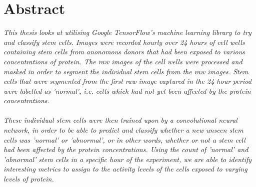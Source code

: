 
\section*{Abstract}

\emph{This thesis looks at utilising Google TensorFlow's machine learning library to try and classify stem cells. Images were recorded hourly over 24 hours of cell wells containing stem cells from anonomous donors that had been exposed to various concentrations of protein. The raw images of the cell wells were processed and masked in order to segment the individual stem cells from the raw images. Stem cells that were segmented from the first raw image captured in the 24 hour period were labelled as 'normal', i.e. cells which had not yet been affected by the protein concentrations. \\ \\  These individual stem cells were then trained upon by a convolutional neural network, in order to be able to predict and classify whether a new unseen stem cells was 'normal' or 'abnormal', or in other words, whether or not a stem cell had been affected by the protein concentrations. Using the count of 'normal' and 'abnormal' stem cells in a specific hour of the experiment, we are able to identify interesting metrics to assign to the activity levels of the cells exposed to varying levels of protein. }
